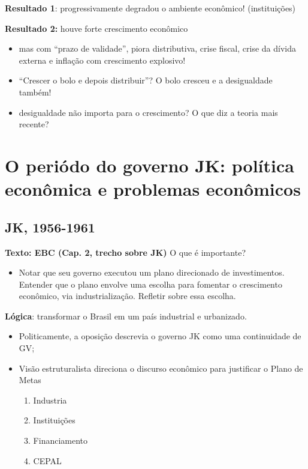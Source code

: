 \documentclass[a4paper,12pt]{article}[abntex2]
\begin{document}
\textbf{Resultado 1}: progressivamente degradou o ambiente econômico! (instituições)

\textbf{Resultado 2:} houve forte crescimento econômico \begin{itemize}
    \item mas com “prazo de validade”, piora distributiva, crise fiscal, crise da dívida externa e inflação com crescimento explosivo!
    \item “Crescer o bolo e depois distribuir”? O bolo cresceu e a desigualdade também!
    \item desigualdade não importa para o crescimento? O que diz a teoria mais recente?
\end{itemize}

\newpage
\section{\textbf{O periódo do governo JK: política econômica e problemas econômicos}}

\subsection{\textbf{JK, 1956-1961}}
\textbf{Texto: EBC (Cap. 2, trecho sobre JK)}
O que é importante?\begin{itemize}
    \item Notar que seu governo executou um plano direcionado de investimentos. Entender que o plano envolve uma escolha para fomentar o crescimento econômico, via industrialização. Refletir sobre essa escolha.
\end{itemize}

\textbf{Lógica}: transformar o Brasil em um país industrial e urbanizado.\begin{itemize}
    \item Politicamente, a oposição descrevia o governo JK como uma     continuidade de GV; 
    \item Visão estruturalista direciona o discurso econômico para justificar o Plano de Metas\begin{enumerate}
        \item Industria
        \item Instituições
        \item Financiamento
        \item CEPAL
    \end{enumerate}
\end{itemize}
\end{document}
